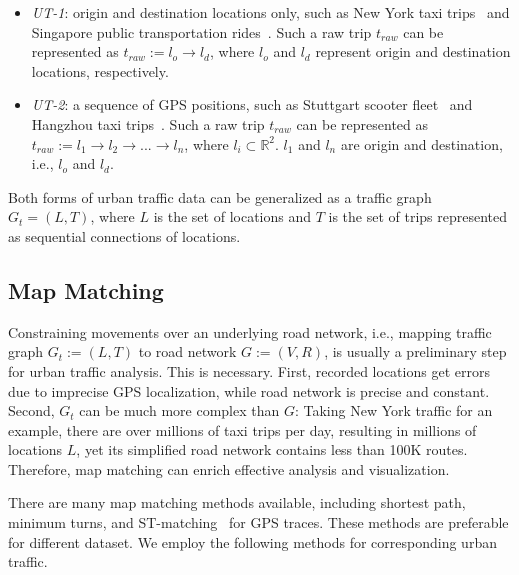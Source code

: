 \begin{itemize}
\item
\textit{UT-1}: origin and destination locations only, such as New York taxi trips~\cite{ferreira2013visual} and Singapore public transportation rides~\cite{zeng_2015_visualizing}.
Such a raw trip $t_{raw}$ can be represented as $t_{raw} := l_o \rightarrow l_d$, where $l_o$ and $l_d$ represent origin and destination locations, respectively.

\item
\textit{UT-2}: a sequence of GPS positions, such as Stuttgart scooter fleet~\cite{kruger_trajectorylenses_2013} and Hangzhou taxi trips~\cite{wang_2014_visual-reasoning}.
Such a raw trip $t_{raw}$ can be represented as $t_{raw} := l_1 \rightarrow l_2 \rightarrow ... \rightarrow l_n$, where $l_i \subset \mathbb{R}^2$. $l_1$ and $l_n$ are origin and destination, i.e., $l_o$ and $l_d$.
\end{itemize}

Both forms of urban traffic data can be generalized as a traffic graph $G_t = (L, T)$, where $L$ is the set of locations and $T$ is the set of trips represented as sequential connections of locations.

\subsection{Map Matching}
\label{section:edge_matching}

Constraining movements over an underlying road network, i.e., mapping traffic graph $G_t := (L, T)$ to road network $G := (V, R)$, is usually a preliminary step for urban traffic analysis.
This is necessary.
First, recorded locations get errors due to imprecise GPS localization, while road network is precise and constant.
Second, $G_t$ can be much more complex than $G$:
Taking New York traffic for an example, there are over millions of taxi trips per day, resulting in millions of locations $L$, yet its simplified road network contains less than 100K routes.
Therefore, map matching can enrich effective analysis and visualization.

There are many map matching methods available, including shortest path, minimum turns, and ST-matching~\cite{lou_2009_map} for GPS traces.
These methods are preferable for different dataset.
We employ the following methods for corresponding urban traffic.

